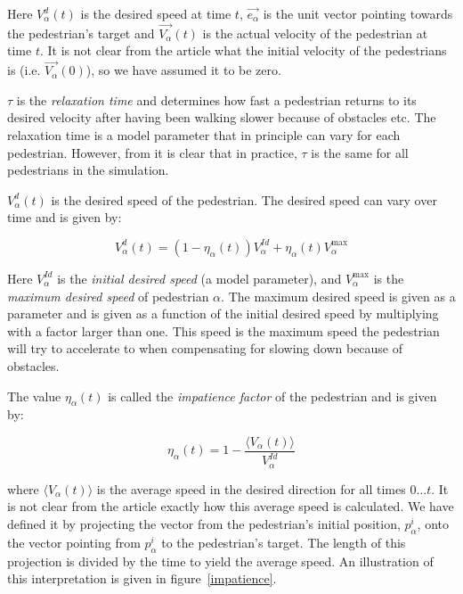 Here $V_{\alpha}^{d}(t)$ is the desired speed at time $t$, 
$\overrightarrow{e_{\alpha}}$ is the unit vector pointing towards the 
pedestrian's target and  $\overrightarrow{V_{\alpha}}(t)$ is the actual 
velocity of the pedestrian at time $t$. It is not clear from the article what 
the initial velocity of the pedestrians is (i.e.  
$\overrightarrow{V_\alpha}(0)$), so we have assumed it to be zero.


$\tau$ is the \emph{relaxation time} and determines how fast a pedestrian 
returns to its desired velocity after having been walking slower because of 
obstacles etc. The relaxation time is a model parameter that in principle can vary 
for each pedestrian. However, from \cite{self-org} it is clear that in 
practice, $\tau$ is the same for all pedestrians in the simulation.

$V_{\alpha}^{d}(t)$ is the desired speed of the pedestrian. The desired speed 
can vary over time and is given by:

\begin{equation}\label{eqn:desired-speed}
    V_{\alpha}^{d}(t) = \left( 1 - \eta_{\alpha}(t) \right) 
    V_{\alpha}^{Id} +
    \eta_{\alpha}(t) V_{\alpha}^{\text{max}}
\end{equation}

Here $V_{\alpha}^{Id}$ is the \emph{initial desired speed} (a model 
parameter), and $V_{\alpha}^{\text{max}}$ is the \emph{maximum desired speed} 
of pedestrian $\alpha$. The maximum desired speed is given as a parameter and 
is given as a function of the initial desired speed by multiplying with a 
factor larger than one. This speed is the maximum speed the pedestrian will 
try to accelerate to when compensating for slowing down because of obstacles.

The value $\eta_{\alpha}(t)$ is called the \emph{impatience factor} of the 
pedestrian and is given by:

\begin{equation}\label{eqn:impatience}
	\eta_{\alpha}(t) =
    1 - \frac{\langle V_{\alpha}(t)\rangle}{V^{Id}_{\alpha}}
\end{equation}

where $\langle V_{\alpha}(t) \rangle$ is the average speed in the desired 
direction for all times $0\dots t$. It is not clear from the article exactly 
how this average speed is calculated. We have defined it by projecting the 
vector from the pedestrian's initial position, $p^i_\alpha$, onto the vector 
pointing from $p^i_\alpha$ to the pedestrian's target. The length of this 
projection is divided by the time to yield the average speed. An 
illustration of this interpretation is given in figure~\ref{impatience}.

